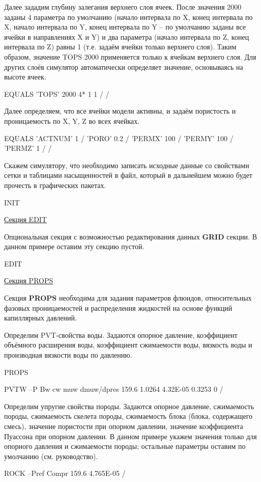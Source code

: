 Далее зададим глубину залегания верхнего слоя ячеек.
После значения 2000 заданы 4 параметра по умолчанию (начало интервала по X, конец интервала по X, начало интервала по Y, конец интервала по Y -- по умолчанию заданы все ячейки в направлениях X и Y) и два параметра (начало интервала по Z, конец интервала по Z) равны 1 (т.е. задаём ячейки только верхнего слоя).
Таким образом, значение TOPS 2000 применяется только к ячейкам верхнего слоя. Для других слоёв симулятор автоматически определяет значение, основываясь на высоте ячеек. 
\begin{eclrun}
EQUALS
'TOPS' 2000 4* 1 1 /
/
\end{eclrun}

Далее определяем, что все ячейки модели активны, и задаём пористость и проницаемость по X, Y, Z во всех ячейках.
\begin{eclrun}
EQUALS
'ACTNUM'  1  /
'PORO'  0.2  /
'PERMX' 100  /
'PERMY' 100  /
'PERMZ'  1  /
/
\end{eclrun}

Скажем симулятору, что необходимо записать исходные данные со свойствами сетки и таблицами насыщенностей в файл, который в дальнейшем можно будет прочесть в графических пакетах.
\begin{eclrun}
INIT
\end{eclrun}

\underline{Секция EDIT}

Опциональная секция с возможностью редактирования данных \textbf{GRID} секции.
В данном примере оставим эту секцию пустой.
\begin{eclrun}
EDIT
\end{eclrun}

\underline{Секция PROPS}

Секция \textbf{PROPS} необходима для задания параметров флюидов, относительных фазовых проницаемостей и распределения жидкостей на основе функций капиллярных давлений.

Определим PVT-свойства воды.
Задаются опорное давление, коэффициент объёмного расширения воды, коэффициент сжимаемости воды, вязкость воды и производная вязкости воды по давлению.
\begin{eclrun}
PROPS

PVTW          
--P    Bw      cw        muw     dmuw/dpres  
159.6  1.0264  4.32E-05  0.3253  0  /
\end{eclrun}

Определим упругие свойства породы.
Задаются опорное давление, сжимаемость породы, сжимаемость скелета породы, сжимаемость блока (блока, содержащего смесь), значение пористости при опорном давлении, значение коэффициента Пуассона при опорном давлении.
В данном примере укажем значения только для опорного давления и сжимаемости породы; остальные параметры оставим по умолчанию (см. руководство).
\begin{eclrun}
ROCK
--Pref  Compr 
159.6  4.765E-05  /
\end{eclrun}

